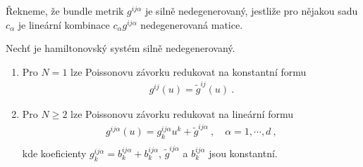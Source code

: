 \begin{definition}
    Řekneme, že bundle metrik $g^{ij \alpha}$ je silně nedegenerovaný, jestliže pro nějakou sadu $c_\alpha$ je lineární kombinace $c_\alpha g^{ij \alpha}$ nedegenerovaná matice.
\end{definition}

\begin{theorem}
    Nechť je hamiltonovský systém silně nedegenerovaný.
    \begin{enumerate}
        \item Pro $N=1$ lze Poissonovu závorku redukovat na konstantní formu
        \begin{align}
            g^{ij}(u) = \tilde g^{ij}(u) \:.
        \end{align}

        \item Pro $N \geq 2$ lze Poissonovu závorku redukovat na lineární formu
        \begin{align}
            g^{ij \alpha}(u) = g^{ij \alpha}_k u^k + \tilde g^{ij \alpha} \:, \quad \alpha = 1, \cdots , d \:, \\
        \end{align}
        kde koeficienty $g^{ij \alpha}_k = b^{ij \alpha}_k + b^{ij \alpha}_k$, $\tilde g^{ij \alpha}$ a $b^{ij \alpha}_k$ jsou konstantní.
    \end{enumerate}
\end{theorem}
